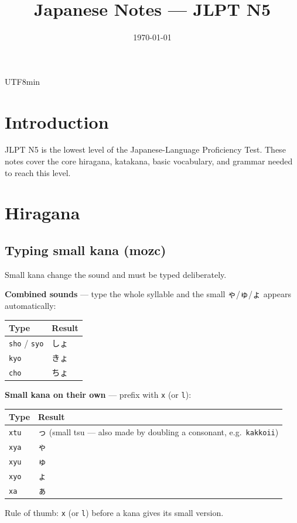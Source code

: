 \documentclass[11pt]{article}
\title{Japanese Notes --- JLPT N5}
\author{}
\date{\today}
\begin{document}
\begin{CJK}{UTF8}{min}

\maketitle
\tableofcontents

\section{Introduction}
JLPT N5 is the lowest level of the Japanese-Language Proficiency Test. These
notes cover the core hiragana, katakana, basic vocabulary, and grammar needed
to reach this level.

\section{Hiragana}

\subsection{Typing small kana (mozc)}
Small kana change the sound and must be typed deliberately.

\textbf{Combined sounds} --- type the whole syllable and the small ゃ/ゅ/ょ
appears automatically:
\begin{center}
\begin{tabular}{@{}ll@{}}
\toprule
Type & Result \\
\midrule
\texttt{sho} / \texttt{syo} & しょ \\
\texttt{kyo} & きょ \\
\texttt{cho} & ちょ \\
\bottomrule
\end{tabular}
\end{center}

\textbf{Small kana on their own} --- prefix with \texttt{x} (or \texttt{l}):
\begin{center}
\begin{tabular}{@{}ll@{}}
\toprule
Type & Result \\
\midrule
\texttt{xtu} & っ (small tsu --- also made by doubling a consonant, e.g.\ \texttt{kakkoii}) \\
\texttt{xya} & ゃ \\
\texttt{xyu} & ゅ \\
\texttt{xyo} & ょ \\
\texttt{xa} & ぁ \\
\bottomrule
\end{tabular}
\end{center}
Rule of thumb: \texttt{x} (or \texttt{l}) before a kana gives its small version.


\end{CJK}
\end{document}
